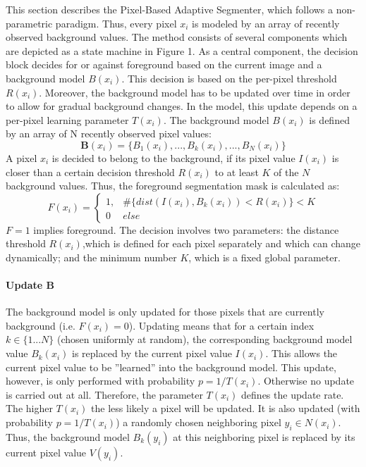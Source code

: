 This section describes the Pixel-Based Adaptive Segmenter, which follows a non-parametric paradigm. Thus,
every pixel $x_i$ is modeled by an array of recently observed background values. The method consists of several components which are depicted as a state machine in Figure 1. As a central component, the decision block decides for or against foreground
based on the current image and a background model $B(x_i)$. This decision is based on the per-pixel threshold $R(x_i)$. Moreover, the background model has to be updated over time in order to allow for gradual background changes. In the model, this update depends on a per-pixel learning parameter $T(x_i)$. \newline The background model $B(x_i)$ is defined by an array of N recently observed pixel values:
\begin{equation}
\mathbf{B}(x_i) = \{B_1(x_i),...,B_k(x_i),...,B_N(x_i)\}
\end{equation}
A pixel $x_i$ is decided to belong to the background, if its
pixel value $I(x_i) $ is closer than a certain decision threshold
$R(x_i)$ to at least $K$ of the $N$ background values. Thus,
the foreground segmentation mask is calculated as:
\begin{equation} \label{eq:F}
F(x_i) = \begin{cases} 1,& \#\{dist(I(x_i), B_k(x_i)) < R(x_i)\} < K \\0 &else\end{cases}
\end{equation}
$F = 1$ implies foreground. The decision involves two parameters: the distance threshold $R(x_i)$,which is defined for each pixel separately and which can change dynamically; and the minimum number $K$, which is a fixed global parameter.
\paragraph{Update B}
The background model is only updated for those pixels that
are currently background (i.e. $F(x_i) = 0$).
Updating means that for a certain index $k \in \{1...N \}$ (chosen uniformly at random), the corresponding background model
value $B_k(x_i)$ is replaced by the current pixel value $I(x_i)$.
This allows the current pixel value to be ”learned” into
the background model. This update, however, is only performed with probability $p = 1/T(x_i)$. Otherwise no update
is carried out at all. Therefore, the parameter $T(x_i)$ defines
the update rate. The higher $T(x_i)$ the less likely a pixel
will be updated.
It is also updated (with probability $p = 1/T(x_i)$) a randomly chosen neighboring pixel $y_i \in N(x_i)$. Thus, the
background model $B_k(y_i)$ at this neighboring pixel is replaced by its current pixel value $V(y_i)$.
